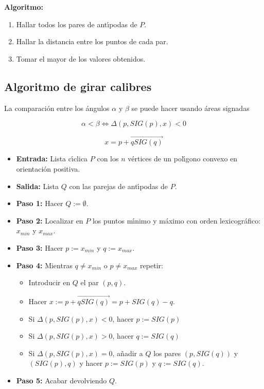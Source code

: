 \documentclass[twoside]{report}
\begin{document}
{\bf Algoritmo:}

\begin{enumerate}
  \item Hallar todos los pares de ant\'{\i}podas de $P$.
  \item Hallar la distancia entre los puntos de cada par.
  \item Tomar el mayor de los valores obtenidos.
\end{enumerate}


\subsection{Algoritmo de girar calibres}


\begin{nota} La comparaci\'{o}n entre los \'{a}ngulos $\alpha$ y $\beta$ se puede hacer
usando \'{a}reas signadas

 $$\alpha<\beta \Leftrightarrow \Delta(p,SIG(p),x)<0$$

 $$x=p+\overrightarrow{qSIG(q)}$$

\end{nota}

\begin{itemize}
  \item\textbf{Entrada:} Lista c\'{\i}clica $P$ con los $n$ v\'{e}rtices de un pol\'{\i}gono
convexo en orientaci\'{o}n positiva.
  \item\textbf{Salida:} Lista $Q$ con las parejas de ant\'{\i}podas de $P$.
  \item\textbf{Paso 1:} Hacer $Q:=\emptyset$.
  \item\textbf{Paso 2:} Localizar en $P$ los puntos m\'{\i}nimo y m\'{a}ximo con orden
lexicogr\'{a}fico: $x_{min}$ y $x_{max}$.
  \item\textbf{Paso 3:} Hacer $p:=x_{min}$ y $q:=x_{max}$.
  \item\textbf{Paso 4:} Mientras $q\neq x_{min}$ o $p\neq x_{max}$ repetir:
\begin{itemize}
  \item Introducir en $Q$ el par $(p,q)$.
  \item Hacer $x:=p+\overrightarrow{qSIG(q)}=p+SIG(q)-q$.
  \item Si $\Delta(p,SIG(p),x)<0$, hacer $p:=SIG(p)$
  \item Si $\Delta(p,SIG(p),x)>0$, hacer $q:=SIG(q)$
  \item Si $\Delta(p,SIG(p),x)=0$, a\~{n}adir a $Q$ los pares $(p,SIG(q))$ y
$(SIG(p),q)$ y hacer $p:=SIG(p)$ y $q:=SIG(q)$.
\end{itemize}
  \item\textbf{Paso 5:} Acabar devolviendo $Q$.
\end{itemize}
\end{document}
